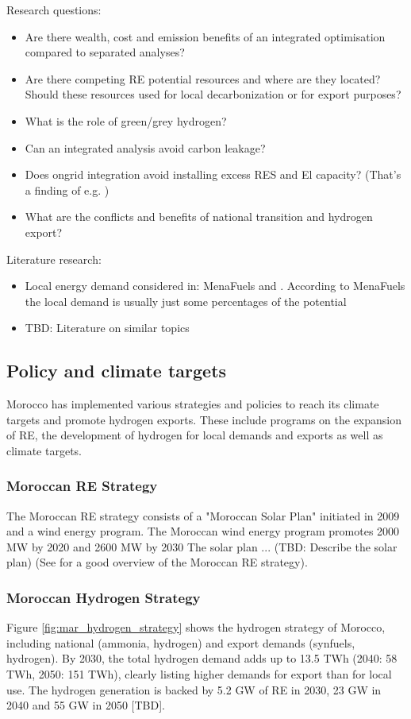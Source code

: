 Research questions:
\begin{itemize}
    \item Are there wealth, cost and emission benefits of an integrated optimisation compared to separated analyses?
    \item Are there competing RE potential resources and where are they located? Should these resources used for local decarbonization or for export purposes?
    \item What is the role of green/grey hydrogen?   
    \item Can an integrated analysis avoid carbon leakage?
    \item Does ongrid integration avoid installing excess RES and El capacity? (That's a finding of e.g. \cite{Ruhnau2022})
    \item What are the conflicts and benefits of national transition and hydrogen export?
\end{itemize}

Literature research:
\begin{itemize}
    \item Local energy demand considered in: MenaFuels and \cite{Hampp2021}. According to MenaFuels the local demand is usually just some percentages of the potential
    \item TBD: Literature on similar topics 
\end{itemize}


\subsection{Policy and climate targets}
Morocco has implemented various strategies and policies to reach its climate targets and promote hydrogen exports. 
These include programs on the expansion of RE, the development of hydrogen for local demands and exports as well as climate targets.

\subsubsection{Moroccan RE Strategy}
The Moroccan RE strategy consists of a "Moroccan Solar Plan" initiated in 2009 \cite[p. 2]{Boulakhbar2020}
and a wind energy program.
The Moroccan wind energy program promotes 2000 MW by 2020 and 2600 MW by 2030 \cite[p. 4]{Boulakhbar2020}
The solar plan ... (TBD: Describe the solar plan)
(See \cite[p. 13]{Ersoy2022} for a good overview of the Moroccan RE strategy).

\subsubsection{Moroccan Hydrogen Strategy}
Figure \ref{fig:mar_hydrogen_strategy} shows the hydrogen strategy of Morocco, including
national (ammonia, hydrogen) and export demands (synfuels, hydrogen).
By 2030, the total hydrogen demand adds up to 13.5 TWh (2040: 58 TWh, 2050: 151 TWh), 
clearly listing higher demands for export than for local use. The hydrogen generation is backed by 5.2 GW of RE in 2030, 23 GW in 2040 and 55 GW in 2050 [TBD].


